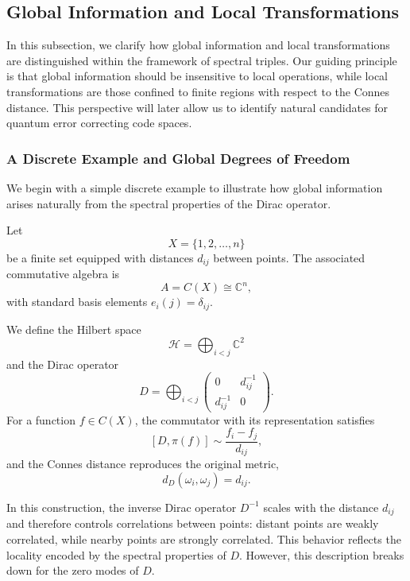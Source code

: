 \documentclass[12pt]{article}
\theoremstyle{definition} %
\theoremstyle{plain} %
\theoremstyle{remark} %
\theoremstyle{underline}
\begin{document}
\subsection{Global Information and Local Transformations}

In this subsection, we clarify how global information and local transformations are distinguished within the framework of spectral triples. Our guiding principle is that global information should be insensitive to local operations, while local transformations are those confined to finite regions with respect to the Connes distance. This perspective will later allow us to identify natural candidates for quantum error correcting code spaces.

\subsubsection{A Discrete Example and Global Degrees of Freedom}

We begin with a simple discrete example to illustrate how global information arises naturally from the spectral properties of the Dirac operator.

Let
\[
    X=\{1,2,\dots,n\}
\]
be a finite set equipped with distances $d_{ij}$ between points. The associated commutative algebra is
\[
    A=C(X)\cong \mathbb{C}^n,
\]
with standard basis elements $e_i(j)=\delta_{ij}$.

We define the Hilbert space
\[
    \mathcal{H}=\bigoplus_{i<j}\mathbb{C}^2
\]
and the Dirac operator
\[
    D=\bigoplus_{i<j}
    \begin{pmatrix}
        0 & d_{ij}^{-1} \\
        d_{ij}^{-1} & 0
    \end{pmatrix}.
\]
For a function $f\in C(X)$, the commutator with its representation satisfies
\[
    [D,\pi(f)] \sim \frac{f_i-f_j}{d_{ij}},
\]
and the Connes distance reproduces the original metric,
\[
    d_D(\omega_i,\omega_j)=d_{ij}.
\]

In this construction, the inverse Dirac operator $D^{-1}$ scales with the distance $d_{ij}$ and therefore controls correlations between points: distant points are weakly correlated, while nearby points are strongly correlated. This behavior reflects the locality encoded by the spectral properties of $D$. However, this description breaks down for the zero modes of $D$.
\end{document}
